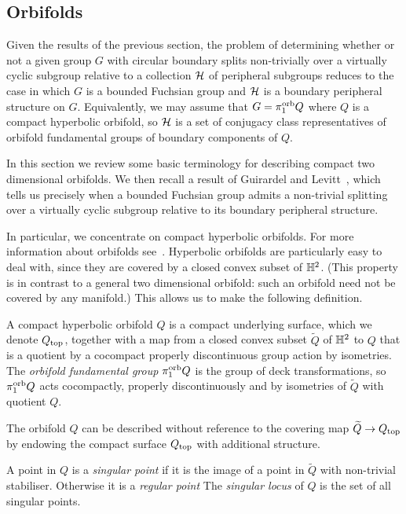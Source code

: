 \subsection{Orbifolds}

Given the results of the previous section, the problem of determining whether or not a given group $G$ with circular boundary splits non-trivially over a virtually cyclic subgroup relative to a collection $\mathcal{H}$ of peripheral subgroups reduces to the case in which $G$ is a bounded Fuchsian group and $\mathcal{H}$ is a boundary peripheral structure on $G$.
Equivalently, we may assume that $G = \pi_1^{\mathrm{orb}} Q$ where $Q$ is a compact hyperbolic orbifold, so $\mathcal{H}$ is a set of conjugacy class representatives of orbifold fundamental groups of boundary components of $Q$.

In this section we review some basic terminology for describing compact two dimensional orbifolds.
We then recall a result of Guirardel and Levitt~\cite{guirardellevitt17}, which tells us precisely when a bounded Fuchsian group admits a non-trivial splitting over a virtually cyclic subgroup relative to its boundary peripheral structure.

In particular, we concentrate on compact hyperbolic orbifolds.
For more information about orbifolds see~\cite{scott83}.
Hyperbolic orbifolds are particularly easy to deal with, since they are covered by a closed convex subset of $\mathbb{H}^2$.
(This property is in contrast to a general two dimensional orbifold: such an orbifold need not be covered by any manifold.)
This allows us to make the following definition.

\begin{definition}
  A compact hyperbolic orbifold $Q$ is a compact underlying surface, which we denote $Q_{\mathrm{top}}$, together with a map from a closed convex subset $\widetilde{Q}$ of $\mathbb{H}^2$ to $Q$ that is a quotient by a cocompact properly discontinuous group action by isometries.
  The \emph{orbifold fundamental group} $\pi_1^{\mathrm{orb}} Q$ is the group of deck transformations, so $\pi_1^{\mathrm{orb}} Q$ acts cocompactly, properly discontinuously and by isometries of $\widetilde{Q}$ with quotient $Q$.
\end{definition}

The orbifold $Q$ can be described without reference to the covering map $\widetilde{Q} \to Q_{\mathrm{top}}$ by endowing the compact surface $Q_{\mathrm{top}}$ with additional structure.

\begin{definition}
  A point in $Q$ is a \emph{singular point} if it is the image of a point in $\widetilde{Q}$ with non-trivial stabiliser.
  Otherwise it is a \emph{regular point}
  The \emph{singular locus} of $Q$ is the set of all singular points.
\end{definition}

